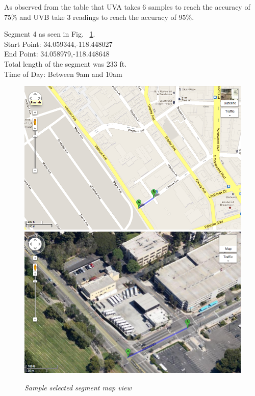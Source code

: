 \documentclass[12pt,fullpage,doublespace]{article}
\begin{document}
As observed from the table that UVA takes 6 samples to reach the accuracy of 75\% and UVB take 3 readings to reach the accuracy of 95\%. 
\newpage\newpage
\begin{center}
Segment 4 as seen in Fig. ~\ref{fig:segment4}. \\
Start Point:  34.059344,-118.448027\\
End Point:  34.058979,-118.448648\\
Total length of the segment was 233 ft.\\
Time of Day: Between 9am and 10am\\
\begin{figure}[h]
\begin{center}
\includegraphics[scale=0.32]{segment4a.png}
\includegraphics[scale=0.32]{segment4b.png}
\caption{\small \sl Sample selected segment map view}\label{fig:segment4}
\end{center}
\end{figure}
\end{center}
\end{document}
